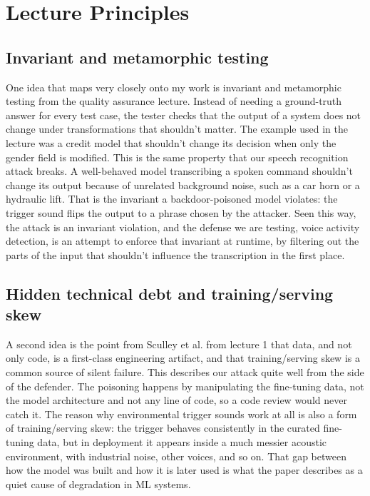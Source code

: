 \documentclass[11pt,a4paper]{article}
\begin{document}
\section{Lecture Principles}


\subsection{Invariant and metamorphic testing}

One idea that maps very closely onto my work is invariant and metamorphic testing from the quality assurance lecture. Instead of needing a ground-truth answer for every test case, the tester checks that the output of a system does not change under transformations that shouldn't matter. The example used in the lecture was a credit model that shouldn't change its decision when only the gender field is modified. This is the same property that our speech recognition attack breaks. A well-behaved model transcribing a spoken command shouldn't change its output because of unrelated background noise, such as a car horn or a hydraulic lift. That is the invariant a backdoor-poisoned model violates: the trigger sound flips the output to a phrase chosen by the attacker. Seen this way, the attack is an invariant violation, and the defense we are testing, voice activity detection, is an attempt to enforce that invariant at runtime, by filtering out the parts of the input that shouldn't influence the transcription in the first place.

\subsection{Hidden technical debt and training/serving skew}

A second idea is the point from Sculley et al. from lecture 1 that data, and not only code, is a first-class engineering artifact, and that training/serving skew is a common source of silent failure. This describes our attack quite well from the side of the defender. The poisoning happens by manipulating the fine-tuning data, not the model architecture and not any line of code, so a code review would never catch it. The reason why environmental trigger sounds work at all is also a form of training/serving skew: the trigger behaves consistently in the curated fine-tuning data, but in deployment it appears inside a much messier acoustic environment, with industrial noise, other voices, and so on. That gap between how the model was built and how it is later used is what the paper describes as a quiet cause of degradation in ML systems.
\end{document}
